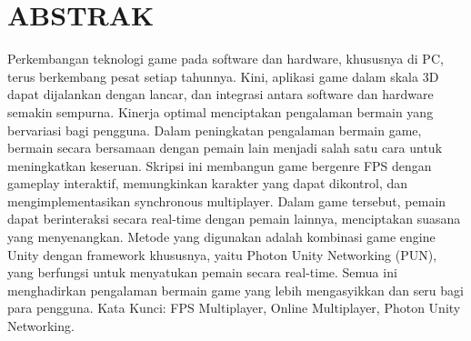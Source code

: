 \chapter*{ABSTRAK}
\noindent


Perkembangan teknologi game pada software dan hardware, khususnya di PC, terus berkembang pesat setiap tahunnya. Kini, aplikasi game dalam skala 3D dapat dijalankan dengan lancar, dan integrasi antara software dan hardware semakin sempurna. Kinerja optimal menciptakan pengalaman bermain yang bervariasi bagi pengguna. Dalam peningkatan pengalaman bermain game, bermain secara bersamaan dengan pemain lain menjadi salah satu cara untuk meningkatkan keseruan. Skripsi ini membangun game bergenre FPS dengan gameplay interaktif, memungkinkan karakter yang dapat dikontrol, dan mengimplementasikan synchronous multiplayer. Dalam game tersebut, pemain dapat berinteraksi secara real-time dengan pemain lainnya, menciptakan suasana yang menyenangkan. Metode yang digunakan adalah kombinasi game engine Unity dengan framework khususnya, yaitu Photon Unity Networking (PUN), yang berfungsi untuk menyatukan pemain secara real-time. Semua ini menghadirkan pengalaman bermain game yang lebih mengasyikkan dan seru bagi para pengguna.
\newline \break
\noindent Kata Kunci: FPS Multiplayer, Online Multiplayer, Photon Unity Networking.